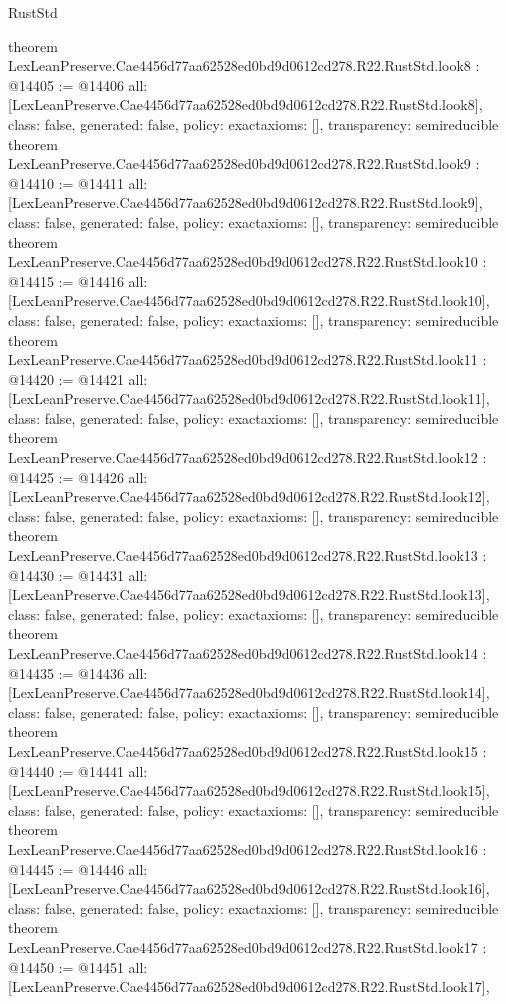 \begin{lexlean}{RustStd}
\begin{coremodule}
{}
theorem LexLeanPreserve.Cae4456d77aa62528ed0bd9d0612cd278.R22.RustStd.look8 : @14405 := @14406 {
  all: [LexLeanPreserve.Cae4456d77aa62528ed0bd9d0612cd278.R22.RustStd.look8],
  class: false,
  generated: false,
  policy: exact{axioms: []},
  transparency: semireducible
}
theorem LexLeanPreserve.Cae4456d77aa62528ed0bd9d0612cd278.R22.RustStd.look9 : @14410 := @14411 {
  all: [LexLeanPreserve.Cae4456d77aa62528ed0bd9d0612cd278.R22.RustStd.look9],
  class: false,
  generated: false,
  policy: exact{axioms: []},
  transparency: semireducible
}
theorem LexLeanPreserve.Cae4456d77aa62528ed0bd9d0612cd278.R22.RustStd.look10 : @14415 := @14416 {
  all: [LexLeanPreserve.Cae4456d77aa62528ed0bd9d0612cd278.R22.RustStd.look10],
  class: false,
  generated: false,
  policy: exact{axioms: []},
  transparency: semireducible
}
theorem LexLeanPreserve.Cae4456d77aa62528ed0bd9d0612cd278.R22.RustStd.look11 : @14420 := @14421 {
  all: [LexLeanPreserve.Cae4456d77aa62528ed0bd9d0612cd278.R22.RustStd.look11],
  class: false,
  generated: false,
  policy: exact{axioms: []},
  transparency: semireducible
}
theorem LexLeanPreserve.Cae4456d77aa62528ed0bd9d0612cd278.R22.RustStd.look12 : @14425 := @14426 {
  all: [LexLeanPreserve.Cae4456d77aa62528ed0bd9d0612cd278.R22.RustStd.look12],
  class: false,
  generated: false,
  policy: exact{axioms: []},
  transparency: semireducible
}
theorem LexLeanPreserve.Cae4456d77aa62528ed0bd9d0612cd278.R22.RustStd.look13 : @14430 := @14431 {
  all: [LexLeanPreserve.Cae4456d77aa62528ed0bd9d0612cd278.R22.RustStd.look13],
  class: false,
  generated: false,
  policy: exact{axioms: []},
  transparency: semireducible
}
theorem LexLeanPreserve.Cae4456d77aa62528ed0bd9d0612cd278.R22.RustStd.look14 : @14435 := @14436 {
  all: [LexLeanPreserve.Cae4456d77aa62528ed0bd9d0612cd278.R22.RustStd.look14],
  class: false,
  generated: false,
  policy: exact{axioms: []},
  transparency: semireducible
}
theorem LexLeanPreserve.Cae4456d77aa62528ed0bd9d0612cd278.R22.RustStd.look15 : @14440 := @14441 {
  all: [LexLeanPreserve.Cae4456d77aa62528ed0bd9d0612cd278.R22.RustStd.look15],
  class: false,
  generated: false,
  policy: exact{axioms: []},
  transparency: semireducible
}
theorem LexLeanPreserve.Cae4456d77aa62528ed0bd9d0612cd278.R22.RustStd.look16 : @14445 := @14446 {
  all: [LexLeanPreserve.Cae4456d77aa62528ed0bd9d0612cd278.R22.RustStd.look16],
  class: false,
  generated: false,
  policy: exact{axioms: []},
  transparency: semireducible
}
theorem LexLeanPreserve.Cae4456d77aa62528ed0bd9d0612cd278.R22.RustStd.look17 : @14450 := @14451 {
  all: [LexLeanPreserve.Cae4456d77aa62528ed0bd9d0612cd278.R22.RustStd.look17],
}
\end{coremodule}
\end{lexlean}

